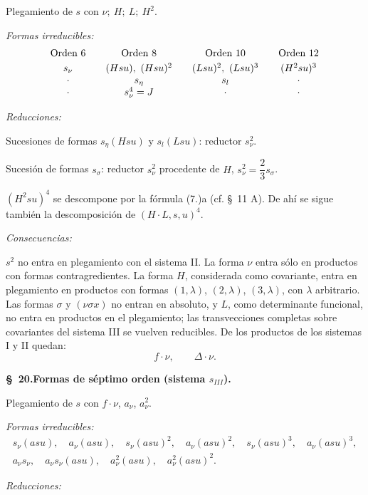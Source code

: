 \documentclass[11pt]{article}
\newcommand{\A}{\Delta}
\begin{document}
Plegamiento de $s$ con $\nu;\ H;\ L;\ H^2$.

\noindent\emph{Formas irreducibles:}
\[
\begin{array}{c@{\qquad}c@{\qquad}c@{\qquad}c}
\text{Orden 6} & \text{Orden 8} & \text{Orden 10} & \text{Orden 12}\\[0.3em]
s_\nu & (Hsu),\ (Hsu)^2 & (Lsu)^2,\ (Lsu)^3 & (H^2su)^3\\
\cdot & s_\eta & s_l & \cdot\\
\cdot & s_\nu^4=J & \cdot & \cdot
\end{array}
\]

\noindent\emph{Reducciones:}

Sucesiones de formas $s_\eta(Hsu)$ y $s_l(Lsu)$: reductor $s_\nu^2$.

Sucesión de formas $s_\sigma$: reductor $s_\nu^2$ procedente de $H$, $s_\nu^2=\dfrac23s_\sigma$.

$(H^2su)^4$ se descompone por la fórmula (7.)a (cf. \S\ 11 A). De ahí se sigue también la descomposición de $(H\cdot L,s,u)^4$.

\noindent\emph{Consecuencias:}

$s^2$ no entra en plegamiento con el sistema II. La forma $\nu$ entra sólo en productos con formas contragredientes. La forma $H$, considerada como covariante, entra en plegamiento en productos con formas $(1,\lambda)$, $(2,\lambda)$, $(3,\lambda)$, con $\lambda$ arbitrario. Las formas $\sigma$ y $(\nu\sigma x)$ no entran en absoluto, y $L$, como determinante funcional, no entra en productos en el plegamiento; las transvecciones completas sobre covariantes del sistema III se vuelven reducibles. De los productos de los sistemas I y II quedan:
\[
 f\cdot\nu,\qquad \A\cdot\nu.
\]

\begin{center}
\textbf{\S\ 20.\quad Formas de séptimo orden (sistema $s_{III}$).}
\end{center}

Plegamiento de $s$ con $f\cdot\nu$, $a_\nu$, $a_\nu^2$.

\noindent\emph{Formas irreducibles:}
\[
\begin{gathered}
s_\nu(asu),\quad a_\nu(asu),\quad s_\nu(asu)^2,\quad a_\nu(asu)^2,
\quad s_\nu(asu)^3,\quad a_\nu(asu)^3,\\
a_\nu s_\nu,
\quad a_\nu s_\nu(asu),
\quad a_\nu^2(asu),
\quad a_\nu^2(asu)^2.
\end{gathered}
\]

\noindent\emph{Reducciones:}
\end{document}
